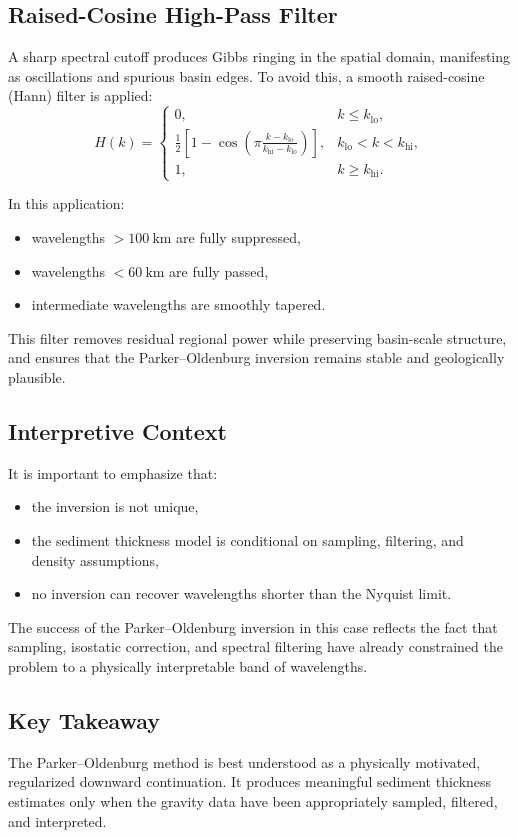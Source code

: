 \documentclass[11pt,a4paper]{article}
\begin{document}
\subsection{Raised-Cosine High-Pass Filter}

A sharp spectral cutoff produces Gibbs ringing in the spatial domain,
manifesting as oscillations and spurious basin edges.
To avoid this, a smooth raised-cosine (Hann) filter is applied:
\begin{equation}
H(k) =
\begin{cases}
0, & k \le k_{\text{lo}}, \\
\frac{1}{2}
\left[
1 - \cos\!\left(
\pi \frac{k - k_{\text{lo}}}{k_{\text{hi}} - k_{\text{lo}}}
\right)
\right],
& k_{\text{lo}} < k < k_{\text{hi}}, \\
1, & k \ge k_{\text{hi}}.
\end{cases}
\end{equation}

In this application:
\begin{itemize}
  \item wavelengths $> 100~\text{km}$ are fully suppressed,
  \item wavelengths $< 60~\text{km}$ are fully passed,
  \item intermediate wavelengths are smoothly tapered.
\end{itemize}

This filter removes residual regional power while preserving basin-scale structure,
and ensures that the Parker--Oldenburg inversion remains stable and geologically
plausible.

\subsection{Interpretive Context}

It is important to emphasize that:
\begin{itemize}
  \item the inversion is not unique,
  \item the sediment thickness model is conditional on sampling, filtering,
        and density assumptions,
  \item no inversion can recover wavelengths shorter than the Nyquist limit.
\end{itemize}

The success of the Parker--Oldenburg inversion in this case reflects the fact that
sampling, isostatic correction, and spectral filtering have already constrained
the problem to a physically interpretable band of wavelengths.

\subsection{Key Takeaway}

The Parker--Oldenburg method is best understood as a physically motivated,
regularized downward continuation.
It produces meaningful sediment thickness estimates only when the gravity data
have been appropriately sampled, filtered, and interpreted.
\end{document}
